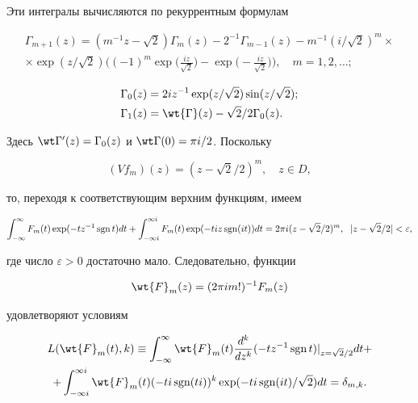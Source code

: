 Эти интегралы вычисляются по рекуррентным формулам


\begin{multline*}


\Gamma_{m+1}(z)=(m^{-1}z-\sqrt2)\Gamma_m(z)-2^{-1}\Gamma_{m-1}(z)


-m^{-1}(i/\sqrt2)^m \times \\


\times \exp(z/\sqrt2)


\bigg( (-1)^m\exp\bigg(\frac{iz}{\sqrt2}\bigg)


-\exp\bigg(-\frac{iz}{\sqrt2}\bigg)\bigg),


\quad m=1, 2, \dotsc;


\end{multline*}


\begin{align*}


\Gamma_0(z)&=2iz^{-1}\exp(z/\sqrt2)\sin(z/\sqrt2); \\


\Gamma_1(z)&=\wt{\Gamma}(z)-\sqrt2/2\Gamma_0(z).


\end{align*}


Здесь $\wt\Gamma^\prime(z)=\Gamma_0(z)$ и $\wt\Gamma(0)=\pi


i/2$. Поскольку


$$


(Vf_m)(z)=(z-\sqrt2/2)^m, \quad z\in D,


$$


то, переходя к соответствующим верхним функциям, имеем


$$


\int_{-\infty}^\infty F_m(t)\exp(-tz^{-1}\sgn


t)dt+\int_{-\infty i}^{\infty i} F_m(t)\exp(-tiz\sgn


(it))dt=2\pi i(z-\sqrt2/2)^m, \ \; |z-\sqrt2/2|<\varepsilon,


$$


где число $\varepsilon>0$ достаточно мало. Следовательно, функции


$$




\wt{F}_m(z)=(2\pi im!)^{-1}F_m(z)




$$


удовлетворяют условиям


\begin{multline*}


L(\wt{F}_m(t),k)\equiv 


\int_{-\infty}^\infty\wt{F}_m(t)


\frac{d^k}{dz^k}(-tz^{-1}\sgn t)|_{z=\sqrt2/2}dt+\\


+\int_{-\infty i}^{\infty i} \wt{F}_m(t)(-ti\sgn(ti))^k


\exp(-ti\sgn (it)/\sqrt2)dt=\delta_{m,k}.


\end{multline*}


